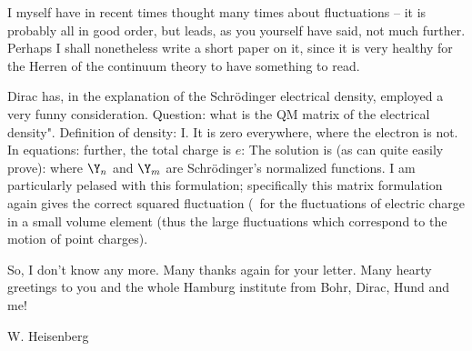 I myself have in recent times thought many times about fluctuations -- it is probably all in good order, but leads, as you yourself have said, not much further. Perhaps I shall nonetheless write a short paper on it, since it is very healthy for the Herren of the continuum theory to have something to read.

Dirac has, in the explanation of the Schr\"odinger electrical density, employed a very funny consideration. Question: what is the QM matrix of the electrical density". Definition of density: I. It is zero everywhere, where the electron is not. In equations:
further, the total charge is $e$:
The solution is (as can quite easily prove):
where $\Y_n$ and $\Y_m$ are Schr\"odinger's normalized functions. I am particularly pelased with this formulation; specifically this matrix formulation again gives the correct squared fluctuation (\ for the fluctuations of electric charge in a small volume element (thus the large fluctuations which correspond to the motion of point charges).

So, I don't know any more. Many thanks again for your letter. Many hearty greetings to you and the whole Hamburg institute from Bohr, Dirac, Hund and me!

W. Heisenberg
